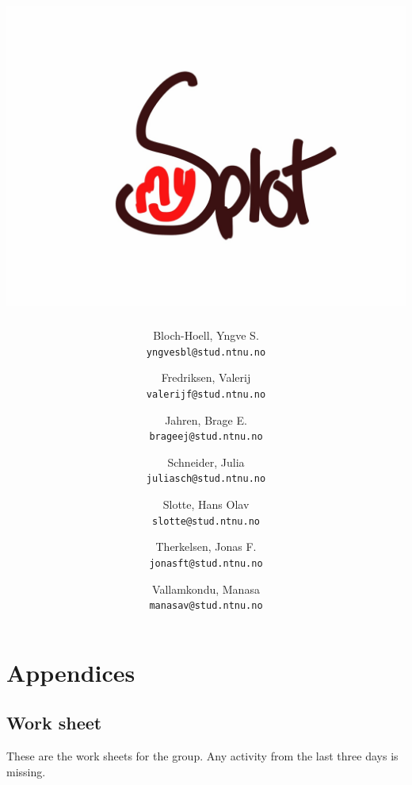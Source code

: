 \documentclass[11pt]{report}
\begin{document}
\begin{titlepage}
\title{\includegraphics[width=0.8\linewidth]{./img/frontpagelogo.jpg}}
\author{
	Bloch-Hoell, Yngve S.\\
	\texttt{yngvesbl@stud.ntnu.no}
	\and
	Fredriksen, Valerij\\
	\texttt{valerijf@stud.ntnu.no}
	\and
	Jahren, Brage E.\\
	\texttt{brageej@stud.ntnu.no}
	\and
	Schneider, Julia\\
	\texttt{juliasch@stud.ntnu.no}
	\and
	Slotte, Hans Olav\\
	\texttt{slotte@stud.ntnu.no}
	\and
	Therkelsen, Jonas F.\\
	\texttt{jonasft@stud.ntnu.no}
	\and
	Vallamkondu, Manasa\\
	\texttt{manasav@stud.ntnu.no}
}
\maketitle
\end{titlepage}


\tableofcontents





\part{Appendices}

\appendix



\chapter{Work sheet}

These are the work sheets for the group. Any activity from the last three days is missing.



\end{document}
